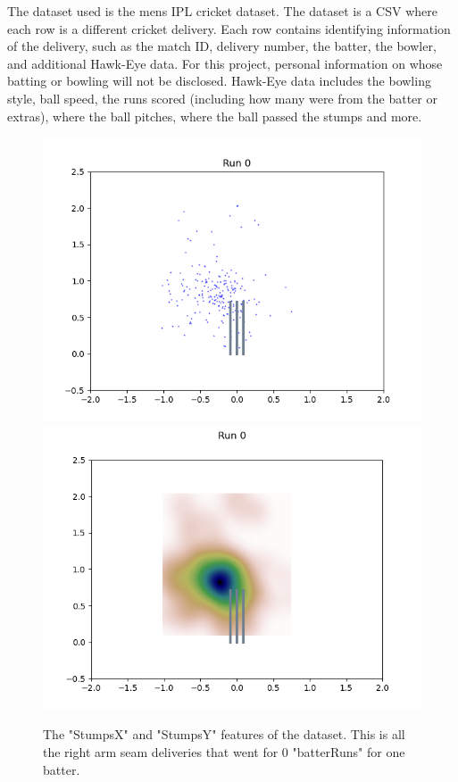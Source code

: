 \documentclass[12pt,a4paper]{report}
\theoremstyle{definition}
\begin{document}
The dataset used is the mens IPL cricket dataset. 
The dataset is a CSV where each row is a different cricket delivery. 
Each row contains identifying information of the delivery, such as the match ID, delivery number, the batter, the bowler, and additional Hawk-Eye data.
For this project, personal information on whose batting or bowling will not be disclosed. 
Hawk-Eye data includes the bowling style, ball speed, the runs scored (including how many were from the batter or extras), where the ball pitches, where the ball passed the stumps and more.     

\begin{figure}[H]
    \centering
    \includegraphics[width=0.49\linewidth]{jos_buttler_0_runs_right_arm_seam_stumps.png}
    \includegraphics[width=0.49\linewidth]{jos_buttler_0_runs_right_arm_seam_stumps_heat_map.png}
    \caption{The "StumpsX" and "StumpsY" features of the dataset. This is all the right arm seam deliveries that went for 0 "batterRuns" for one batter.}
    \label{fig:StumpsXY0Runs}
\end{figure}
\end{document}
